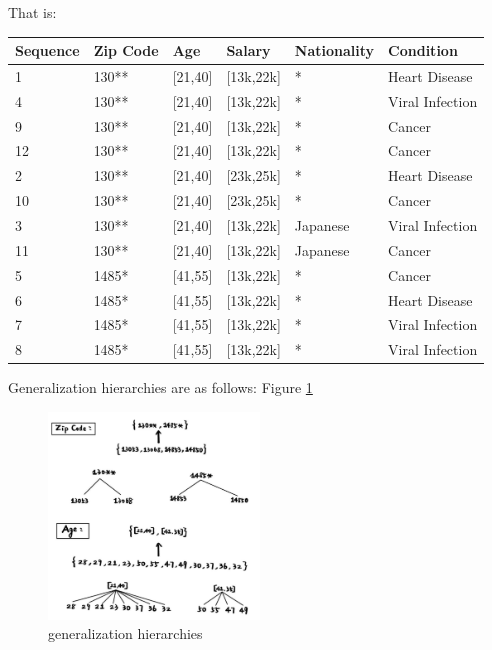 \documentclass[12pt]{article}
\begin{document}
\newline
That is:
\newline
\begin{tabular}{|l|l|l|l|l|l|}
    \hline
    Sequence            & Zip Code & Age     & Salary    & Nationality & Condition       \\
    \hline
    \rowcolor{red} 1    & 130**    & [21,40] & [13k,22k] & *           & Heart Disease   \\
    \hline
    \rowcolor{red} 4    & 130**    & [21,40] & [13k,22k] & *           & Viral Infection \\
    \hline
    \rowcolor{red} 9    & 130**    & [21,40] & [13k,22k] & *           & Cancer          \\
    \hline
    \rowcolor{red} 12   & 130**    & [21,40] & [13k,22k] & *           & Cancer          \\
    \hline
    \rowcolor{blue} 2   & 130**    & [21,40] & [23k,25k] & *           & Heart Disease   \\
    \hline
    \rowcolor{blue} 10  & 130**    & [21,40] & [23k,25k] & *           & Cancer          \\
    \hline
    \rowcolor{green} 3  & 130**    & [21,40] & [13k,22k] & Japanese    & Viral Infection \\
    \hline
    \rowcolor{green} 11 & 130**    & [21,40] & [13k,22k] & Japanese    & Cancer          \\
    \hline
    \rowcolor{yellow} 5 & 1485*    & [41,55] & [13k,22k] & *           & Cancer          \\
    \hline
    \rowcolor{yellow} 6 & 1485*    & [41,55] & [13k,22k] & *           & Heart Disease   \\
    \hline
    \rowcolor{yellow} 7 & 1485*    & [41,55] & [13k,22k] & *           & Viral Infection \\
    \hline
    \rowcolor{yellow} 8 & 1485*    & [41,55] & [13k,22k] & *           & Viral Infection \\
    \hline
\end{tabular}
\newline
Generalization hierarchies are as follows:
Figure \ref{fig:1}
\begin{figure}[htbp]
    \centering
    \includegraphics[width = 0.5\textwidth]{pics/pic1.jpg}
    \caption{generalization hierarchies}
    \label{fig:1}
\end{figure}
\end{document}
